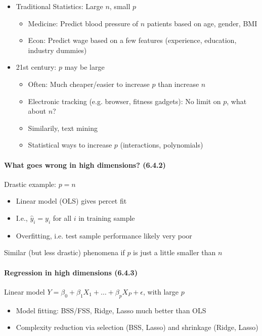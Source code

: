 \documentclass[11pt,a4paper,numbers=endperiod]{scrartcl}
\begin{document}
{\begin{itemize}
	\item Traditional Statistics: Large $n$, small $p$ \begin{itemize}
		\item Medicine: Predict blood pressure of $n$ patients based on age, gender, BMI 
		\item Econ: Predict wage based on a few features (experience, education, industry dummies)
	\end{itemize}
	\item 21st century: $p$ may be large \begin{itemize}
		\item Often: Much cheaper/easier to increase $p$ than increase $n$
		\item Electronic tracking (e.g. browser, fitness gadgets): No limit on $p$, what about $n$?
		\item Similarily, text mining
		\item Statistical ways to increase $p$ (interactions, polynomials)
	\end{itemize}
\end{itemize}
\newpage
\paragraph{What goes wrong in high dimensions? (6.4.2)} 
$ $\\ 

Drastic example: $p = n$ \begin{itemize}
	\item Linear model (OLS) gives percet fit
	\item I.e., $\hat{y}_i = y_i$ for all $i$ in training sample
	\item Overfitting, i.e. test sample performance likely very poor
\end{itemize}
Similar (but less drastic) phenomena if $p$ is just a little smaller than $n$

\paragraph{Regression in high dimensions (6.4.3)} 
$ $\\

Linear model $Y = \beta_0 + \beta_1X_1 + \ldots + \beta_pX_P + \epsilon$, with large $p$ \begin{itemize}
	\item Model fitting: BSS/FSS, Ridge, Lasso much better than OLS
	\item Complexity reduction via selection (BSS, Lasso) and shrinkage (Ridge, Lasso)
\end{itemize}

}
\end{document}
